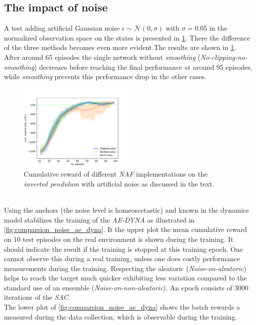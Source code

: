 \documentclass[
reprint,
amsmath,amssymb,amsfonts,clevref,
aps,
prstab,
]{revtex4-2}
\begin{document}
	\subsection{The impact of noise}
	A test adding artificial Gaussian noise $\epsilon \sim \mathcal{N}(0, \sigma)$ with $\sigma=0.05$ in the normalized observation space on the states is presented in \cref{fig:comparsion_noise}. There the difference of the three methods becomes even more evident.The results are shown in \cref{fig:comparsion_noise}. After around 65 episodes the single network without \emph{smoothing} (\emph{No-clipping-no-smoothing}) decreases before reaching the final performance at around 95 episodes, while  \emph{smoothing} prevents this performance drop in the other cases. 
	\begin{figure}[!h]
		\centering
		\includegraphics*[width=0.5\textwidth]{Figures/Comparison_noise}
		\caption{Cumulative reward of different \emph{NAF} implementations on the \emph{inverted pendulum} with artificial noise as discussed in the text.}
		\label{fig:comparsion_noise}
	\end{figure}
	\\Using the anchors (the noise level is homeoscetastic) and known in the dynamics model stabilizes the training of the \emph{AE-DYNA} as illustrated in \cref{fig:comparsion_noise_ae_dyna}. It the upper plot the mean cumulative reward on 10 test episodes on the real environment is shown during the training. It should indicate the result if the training is stopped at this training epoch. One cannot observe this during a real training, unless one does costly performance measurements during the training. Respecting the aleatoric (\emph{Noise-on-aleatoric}) helps to reach the target much quicker exhibiting less variation compared to the standard use of an ensemble (\emph{Noise-on-non-aleatoric}). An epoch consists of 3000 iterations of the \emph{SAC}.\\
	The lower plot of \cref{fig:comparsion_noise_ae_dyna} shows the batch rewards a measured during the data collection, which is observable during the training.
\end{document}
